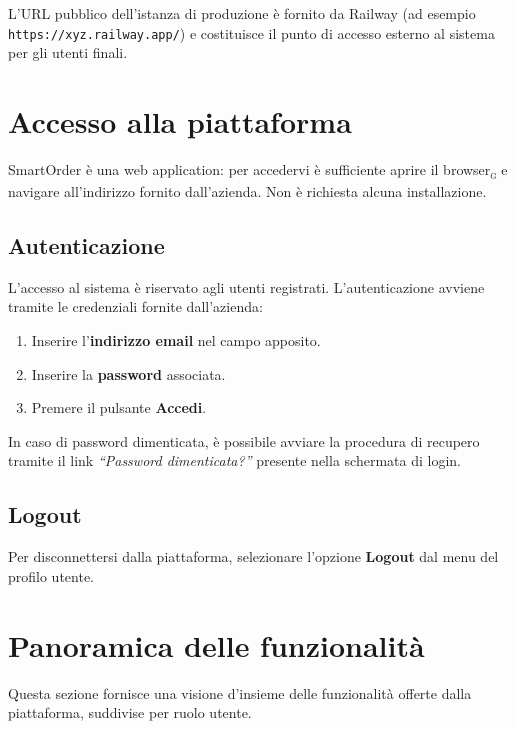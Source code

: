 \documentclass[a4paper, 11pt, oneside]{scrartcl}
\begin{document}
L'URL pubblico dell'istanza di produzione \`e fornito da Railway (ad esempio \texttt{https://xyz.railway.app/}) e costituisce il punto di accesso esterno al sistema per gli utenti finali.


\newpage
\section{Accesso alla piattaforma}
SmartOrder \`e una web application: per accedervi \`e sufficiente aprire il browser\textsubscript{\textsc{g}} e navigare all'indirizzo fornito dall'azienda. Non \`e richiesta alcuna installazione.

\subsection{Autenticazione}
L'accesso al sistema \`e riservato agli utenti registrati. L'autenticazione avviene tramite le credenziali fornite dall'azienda:

\begin{enumerate}[noitemsep]
    \item Inserire l'\textbf{indirizzo email} nel campo apposito.
    \item Inserire la \textbf{password} associata.
    \item Premere il pulsante \textbf{Accedi}.
\end{enumerate}

In caso di password dimenticata, \`e possibile avviare la procedura di recupero tramite il link \textit{``Password dimenticata?''} presente nella schermata di login.

\subsection{Logout}
Per disconnettersi dalla piattaforma, selezionare l'opzione \textbf{Logout} dal menu del profilo utente.

\newpage
\section{Panoramica delle funzionalit\`a}
Questa sezione fornisce una visione d'insieme delle funzionalit\`a offerte dalla piattaforma, suddivise per ruolo utente.
\end{document}
